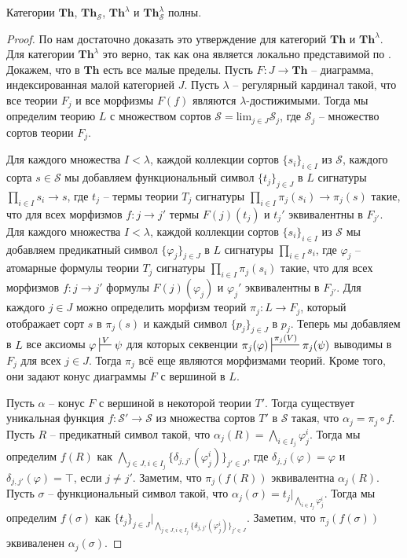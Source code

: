 \documentclass[reqno]{amsart}
\theoremstyle{definition}
\theoremstyle{remark}
\newcommand{\bcat}[1]{\mathbf{#1}}
\newcommand{\fs}[1]{\mathrm{#1}}
\newcommand{\Th}{\bcat{Th}}
\begin{document}
\begin{prop}[th-limits]
Категории $\Th$, $\Th_\mathcal{S}$, $\Th^\lambda$ и $\Th_\mathcal{S}^\lambda$ полны.
\end{prop}
\begin{proof}
По  нам достаточно доказать это утверждение для категорий $\Th$ и $\Th^\lambda$.
Для категории $\Th^\lambda$ это верно, так как она является локально представимой по .
Докажем, что в $\Th$ есть все малые пределы.
Пусть $F : J \to \Th$ -- диаграмма, индексированная малой категорией $J$.
Пусть $\lambda$ -- регулярный кардинал такой, что все теории $F_j$ и все морфизмы $F(f)$ являются $\lambda$-достижимыми.
Тогда мы определим теорию $L$ с множеством сортов $\mathcal{S} = \fs{lim}_{j \in J} \mathcal{S}_j$, где $\mathcal{S}_j$ -- множество сортов теории $F_j$.

Для каждого множества $I < \lambda$, каждой коллекции сортов $\{ s_i \}_{i \in I}$ из $\mathcal{S}$, каждого сорта $s \in \mathcal{S}$ мы добавляем функциональный символ $\{ t_j \}_{j \in J}$ в $L$ сигнатуры $\prod_{i \in I} s_i \to s$,
где $t_j$ -- термы теории $T_j$ сигнатуры $\prod_{i \in I} \pi_j(s_i) \to \pi_j(s)$ такие, что для всех морфизмов $f : j \to j'$ термы $F(j)(t_j)$ и $t_j'$ эквивалентны в $F_{j'}$.
Для каждого множества $I < \lambda$, каждой коллекции сортов $\{ s_i \}_{i \in I}$ из $\mathcal{S}$ мы добавляем предикатный символ $\{ \varphi_j \}_{j \in J}$ в $L$ сигнатуры $\prod_{i \in I} s_i$,
где $\varphi_j$ -- атомарные формулы теории $T_j$ сигнатуры $\prod_{i \in I} \pi_j(s_i)$ такие, что для всех морфизмов $f : j \to j'$ формулы $F(j)(\varphi_j)$ и $\varphi_j'$ эквивалентны в $F_{j'}$.
Для каждого $j \in J$ можно определить морфизм теорий $\pi_j : L \to F_j$, который отображает сорт $s$ в $\pi_j(s)$ и каждый символ $\{ p_j \}_{j \in J}$ в $p_j$.
Теперь мы добавляем в $L$ все аксиомы $\varphi \sststile{}{V} \psi$ для которых секвенции $\pi_j(\varphi) \sststile{}{\pi_j(V)} \pi_j(\psi)$ выводимы в $F_j$ для всех $j \in J$.
Тогда $\pi_j$ всё еще являются морфизмами теорий.
Кроме того, они задают конус диаграммы $F$ с вершиной в $L$.

Пусть $\alpha$ -- конус $F$ с вершиной в некоторой теории $T'$.
Тогда существует уникальная функция $f : \mathcal{S}' \to \mathcal{S}$ из множества сортов $T'$ в $\mathcal{S}$ такая, что $\alpha_j = \pi_j \circ f$.
Пусть $R$ -- предикатный символ такой, что $\alpha_j(R) = \bigwedge_{i \in I_j} \varphi^i_j$.
Тогда мы определим $f(R)$ как $\bigwedge_{j \in J, i \in I_j} \{ \delta_{j,j'}(\varphi^i_j) \}_{j' \in J}$, где $\delta_{j,j}(\varphi) = \varphi$ и $\delta_{j,j'}(\varphi) = \top$, если $j \neq j'$.
Заметим, что $\pi_j(f(R))$ эквивалентна $\alpha_j(R)$.
Пусть $\sigma$ -- функциональный символ такой, что $\alpha_j(\sigma) = t_j|_{\bigwedge_{i \in I_j} \varphi^i_j}$.
Тогда мы определим $f(\sigma)$ как $\{ t_j \}_{j \in J}|_{\bigwedge_{j \in J, i \in I_j} \{ \delta_{j,j'}(\varphi^i_j) \}_{j' \in J}}$.
Заметим, что $\pi_j(f(\sigma))$ эквиваленен $\alpha_j(\sigma)$.


\end{proof}
\end{document}
